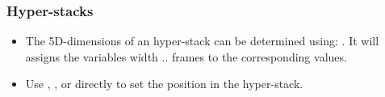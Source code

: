\begin{frame}
  \frametitle<presentation>{Hyper-stacks}
  \begin{itemize}
  \item The 5D-dimensions of an hyper-stack can be determined using:
    . It
    will assigns the variables width .. frames to the corresponding
    values.
  \item Use , ,
     or directly
     to set the position in the
    hyper-stack.
  \end{itemize}
\end{frame}

